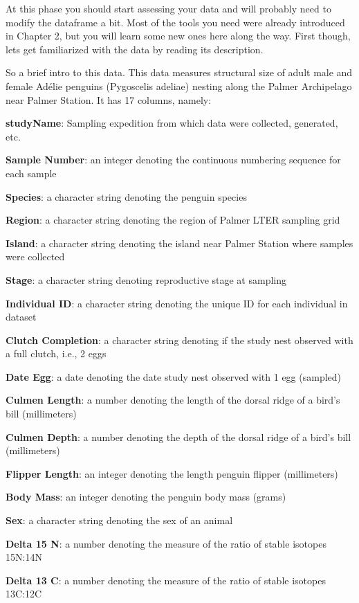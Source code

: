 \documentclass[
]{book}
\begin{document}
At this phase you should start assessing your data and will probably need to modify the dataframe a bit.
Most of the tools you need were already introduced in Chapter 2, but you will learn some new ones here along the way.
First though, lets get familiarized with the data by reading its description.

So a brief intro to this data.
This data measures structural size of adult male and female Adélie penguins (Pygoscelis adeliae) nesting along the Palmer Archipelago near Palmer Station.
It has 17 columns, namely:

\textbf{studyName}: Sampling expedition from which data were collected, generated, etc.

\textbf{Sample Number}: an integer denoting the continuous numbering sequence for each sample

\textbf{Species}: a character string denoting the penguin species

\textbf{Region}: a character string denoting the region of Palmer LTER sampling grid

\textbf{Island}: a character string denoting the island near Palmer Station where samples were collected

\textbf{Stage}: a character string denoting reproductive stage at sampling

\textbf{Individual ID}: a character string denoting the unique ID for each individual in dataset

\textbf{Clutch Completion}: a character string denoting if the study nest observed with a full clutch, i.e., 2 eggs

\textbf{Date Egg}: a date denoting the date study nest observed with 1 egg (sampled)

\textbf{Culmen Length}: a number denoting the length of the dorsal ridge of a bird's bill (millimeters)

\textbf{Culmen Depth}: a number denoting the depth of the dorsal ridge of a bird's bill (millimeters)

\textbf{Flipper Length}: an integer denoting the length penguin flipper (millimeters)

\textbf{Body Mass}: an integer denoting the penguin body mass (grams)

\textbf{Sex}: a character string denoting the sex of an animal

\textbf{Delta 15 N}: a number denoting the measure of the ratio of stable isotopes 15N:14N

\textbf{Delta 13 C}: a number denoting the measure of the ratio of stable isotopes 13C:12C
\end{document}
